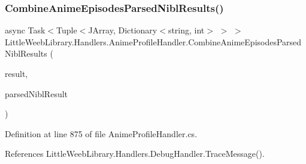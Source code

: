 \subsubsection{\texorpdfstring{Combine\+Anime\+Episodes\+Parsed\+Nibl\+Results()}{CombineAnimeEpisodesParsedNiblResults()}}
{\footnotesize\ttfamily async Task$<$Tuple$<$J\+Array, Dictionary$<$string, int$>$ $>$ $>$ Little\+Weeb\+Library.\+Handlers.\+Anime\+Profile\+Handler.\+Combine\+Anime\+Episodes\+Parsed\+Nibl\+Results (\begin{DoxyParamCaption}\item[{J\+Array}]{result,  }\item[{Dictionary$<$ string, Dictionary$<$ int, List$<$ J\+Object $>$$>$$>$}]{parsed\+Nibl\+Result }\end{DoxyParamCaption})\hspace{0.3cm}{\ttfamily [private]}}



Definition at line 875 of file Anime\+Profile\+Handler.\+cs.



References Little\+Weeb\+Library.\+Handlers.\+Debug\+Handler.\+Trace\+Message().



